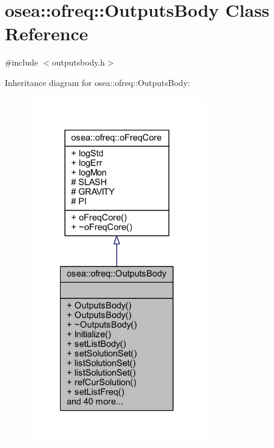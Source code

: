 \hypertarget{classosea_1_1ofreq_1_1_outputs_body}{\section{osea\-:\-:ofreq\-:\-:Outputs\-Body Class Reference}
\label{classosea_1_1ofreq_1_1_outputs_body}
}


{\ttfamily \#include $<$outputsbody.\-h$>$}



Inheritance diagram for osea\-:\-:ofreq\-:\-:Outputs\-Body\-:
\nopagebreak
\begin{figure}[H]
\begin{center}
\leavevmode
\includegraphics[width=220pt]{classosea_1_1ofreq_1_1_outputs_body__inherit__graph}
\end{center}
\end{figure}
